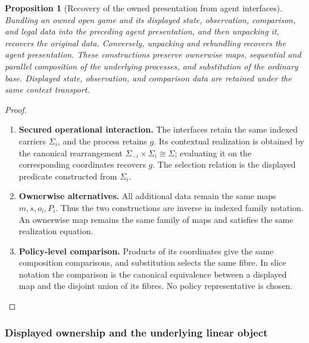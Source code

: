 \documentclass[11pt,a4paper]{article}
\numberwithin{equation}{section}
\newtheorem{proposition}[theorem]{Proposition}
\theoremstyle{definition}
\theoremstyle{remark}
\theoremstyle{plain}
\begin{document}
\begin{proposition}[Recovery of the owned presentation from agent interfaces]
\label{prop:egt-agent-presentation}
Bundling an owned open game and its displayed state, observation, comparison,
and legal data into the preceding agent presentation, and then unpacking it,
recovers the original data. Conversely, unpacking and rebundling recovers the
agent presentation. These constructions preserve ownerwise maps, sequential
and parallel composition of the underlying processes, and substitution of
the ordinary base. Displayed state, observation, and comparison data are
retained under the same context transport.
\end{proposition}
\begin{proof}
\leavevmode
\begin{enumerate}[label=\textup{(\arabic*)},leftmargin=*,itemsep=4pt,topsep=3pt]
  \item \textbf{Secured operational interaction.} The interfaces retain the same indexed carriers $\Sigma_i$, and the process
retains $g$. Its contextual realization is obtained by the canonical
rearrangement $\Sigma_{-i}\times\Sigma_i\cong\Sigma$; evaluating it on the
corresponding coordinates recovers $g$. The selection relation is the
displayed predicate constructed from $\Sigma_i$.
  \item \textbf{Ownerwise alternatives.} All additional data remain
the same maps $m,s,o_i,P_i$. Thus the two constructions are inverse in indexed
family notation. An ownerwise map remains the same family of maps and
satisfies the same realization equation.
  \item \textbf{Policy-level comparison.} Products of its coordinates give
the same composition comparisons, and substitution selects the same fibre. In slice notation the comparison is the canonical equivalence between a
displayed map and the disjoint union of its fibres. No policy representative
is chosen.
\end{enumerate}
\end{proof}

\subsubsection{Displayed ownership and the underlying linear object}
\label{agt-sec-agenttypes}
\end{document}
